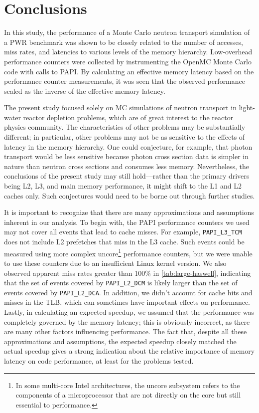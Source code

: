 \documentclass{mc2015}
\begin{document}
\section{Conclusions}

In this study, the performance of a Monte Carlo neutron transport simulation of
a PWR benchmark was shown to be closely related to the number of accesses, miss
rates, and latencies to various levels of the memory hierarchy. Low-overhead
performance counters were collected by instrumenting the OpenMC Monte Carlo
code with calls to PAPI. By calculating an effective memory latency based on
the performance counter measurements, it was seen that the observed performance
scaled as the inverse of the effective memory latency.

The present study focused solely on MC simulations of neutron transport in
light-water reactor depletion problems, which are of great interest to the
reactor physics community. The characteristics of other problems may be
substantially different; in particular, other problems may not be as sensitive
to the effects of latency in the memory hierarchy. One could conjecture, for
example, that photon transport would be less sensitive because photon cross
section data is simpler in nature than neutron cross sections and consumes less
memory. Nevertheless, the conclusions of the present study may still
hold---rather than the primary drivers being L2, L3, and main memory
performance, it might shift to the L1 and L2 caches only. Such conjectures
would need to be borne out through further studies.

It is important to recognize that there are many approximations and assumptions
inherent in our analysis. To begin with, the PAPI performance counters we used
may not cover all events that lead to cache misses. For example,
\texttt{PAPI\_L3\_TCM} does not include L2 prefetches that miss in the L3
cache. Such events could be measured using more complex uncore\footnote{In some
  multi-core Intel architectures, the uncore subsystem refers to the components
  of a microprocessor that are not directly on the core but still essential to
  performance.} performance counters, but we were unable to use these counters
due to an insufficient Linux kernel version. We also observed apparent miss
rates greater than 100\% in \autoref{tab:large-haswell}, indicating that the
set of events covered by \texttt{PAPI\_L2\_DCM} is likely larger than the set
of events covered by \texttt{PAPI\_L2\_DCA}. In addition, we didn't account for
cache hits and misses in the TLB, which can sometimes have important effects on
performance. Lastly, in calculating an expected speedup, we assumed that the
performance was completely governed by the memory latency; this is obviously
incorrect, as there are many other factors influencing performance. The fact
that, despite all these approximations and assumptions, the expected speedup
closely matched the actual speedup gives a strong indication about the relative
importance of memory latency on code performance, at least for the problems
tested.
\end{document}
